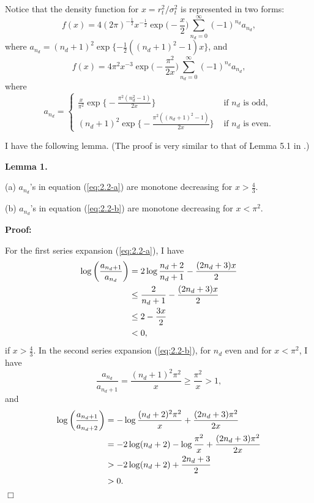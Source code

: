 \documentclass[11pt]{article}
\begin{document}
Notice that the density function for $x=r_t^2/\sigma_t^2$ is represented in two forms: 
\begin{equation} \label{eq:2.2-a}
f(x) =4(2\pi)^{-\frac{1}{2}}x^{-\frac{1}{2}}\exp\Big(-\frac{x}{2}\Big)\sum_{n_d=0}^\infty (-1)^{n_d} a_{n_d}, 
\end{equation}
where 
$a_{n_d} = (n_d+1)^2 \exp\{-\frac{1}{2}((n_d+1)^2-1)x\}$, 
and
\begin{equation} \label{eq:2.2-b}
f(x) =4\pi^2 x^{-3} \exp\bigg( -\frac{\pi^2}{2x} \bigg)\sum_{n_d=0}^\infty (-1)^{n_d} a_{n_d}, 
\end{equation}
where 
\begin{equation*}
a_{n_d} = \begin{cases}
\frac{x}{\pi^2} \exp\big\{-\frac{\pi^2(n_d^2-1)}{2x}\big\} & \text{ if } n_d \text{ is odd}, \\
(n_d+1)^2 \exp\big\{-\frac{\pi^2((n_d+1)^2-1)}{2x}\big\} & \text{ if } n_d \text{ is even}.
\end{cases}
\end{equation*}


I have the following lemma. (The proof is very similar to that of Lemma 5.1 in \cite{Devroye(1986)}.) 

\vspace{0.5\baselineskip}

\noindent
{\bf Lemma 1.} 

(a) $a_{n_d}$'s in equation (\ref{eq:2.2-a}) are monotone decreasing for $x>\frac{4}{3}$.

(b) $a_{n_d}$'s in equation (\ref{eq:2.2-b}) are monotone decreasing for $x<\pi^2$.

\vspace{0.25\baselineskip}

\noindent
{\bf Proof:} 

For the first series expansion (\ref{eq:2.2-a}), I have 
\begin{align}
\log\bigg(\frac{a_{n_d+1}}{a_{n_d}} \bigg) &= 2\log\frac{n_d+2}{n_d+1} -\frac{(2n_d+3)x}{2} \notag \\
&\le \frac{2}{n_d+1} -\frac{(2n_d+3)x}{2} \notag \\
&\le 2 -\frac{3x}{2} \notag \\
&< 0,
\end{align}
if $x>\frac{4}{3}$. 
In the second series expansion (\ref{eq:2.2-b}), for $n_d$ even and for $x<\pi^2$, I have 
\begin{equation}
\frac{a_{n_d}}{a_{n_d+1}} = \frac{(n_d+1)^2\pi^2}{x} \ge \frac{\pi^2}{x} >1, 
\end{equation}
and
\begin{align}
\log\bigg(\frac{a_{n_d+1}}{a_{n_d+2}} \bigg) &= -\log\frac{(n_d+2)^2\pi^2}{x} +\frac{(2n_d+3)\pi^2}{2x} \notag \\
&= -2\log(n_d+2) -\log\frac{\pi^2}{x}+\frac{(2n_d+3)\pi^2}{2x} \notag \\
&> -2\log(n_d+2) +\frac{2n_d+3}{2} \notag \\
&> 0.
\end{align}
\hspace{\fill}
$\Box$
\end{document}
